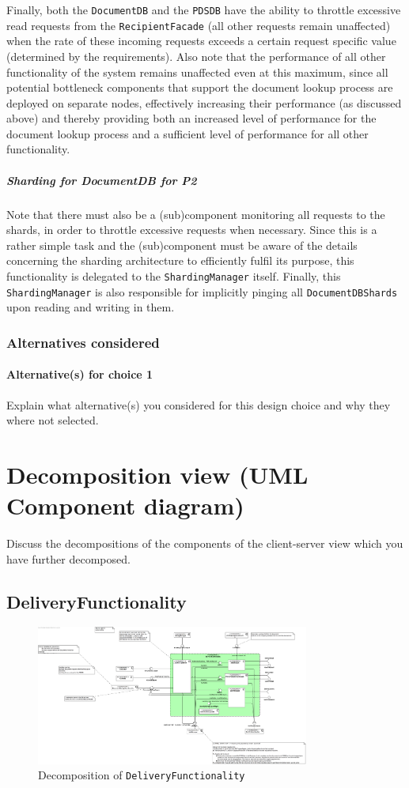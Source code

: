 \documentclass[a4paper,10pt]{article}
\begin{document}
Finally, both the \texttt{DocumentDB} and the \texttt{PDSDB} have the ability to throttle excessive read requests from the \texttt{RecipientFacade} (all other requests remain unaffected) when the rate of these incoming requests exceeds a certain request specific value (determined by the requirements). Also note that the performance of all other functionality of the system remains unaffected even at this maximum, since all potential bottleneck components that support the document lookup process are deployed on separate nodes, effectively increasing their performance (as discussed above) and thereby providing both an increased level of performance for the document lookup process and a sufficient level of performance for all other functionality.
\subparagraph{Sharding for DocumentDB for P2}
Note that there must also be a (sub)component monitoring all requests to the shards, in order to throttle excessive requests when necessary. Since this is a rather simple task and the (sub)component must be aware of the details concerning the sharding architecture to efficiently fulfil its purpose, this functionality is delegated to the \texttt{ShardingManager} itself. Finally, this \texttt{ShardingManager} is also responsible for implicitly pinging all \texttt{DocumentDBShards} upon reading and writing in them.
\subsubsection*{Alternatives considered}
\paragraph{Alternative(s) for choice 1} Explain what alternative(s) you
considered for this design choice and why they where not selected.

\section{Decomposition view (UML Component diagram)}\label{sec:decomposition}
Discuss the decompositions of the components of the client-server view which
you have further decomposed.

\subsection{DeliveryFunctionality}\label{subsec:decomp-DeliveryFunctionality}
\begin{figure}[!htp]
	\centering
	\includegraphics[width=0.8\textwidth]{DeliveryFunctionality.png}
	\caption{Decomposition of \texttt{DeliveryFunctionality}}
	\label{fig:decomp-DeliveryFunctionality}
\end{figure}
\FloatBarrier
\end{document}
